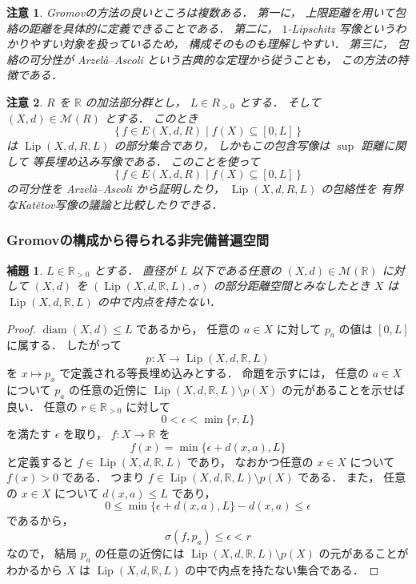\documentclass[leqno, 12pt]{jsarticle}
\newtheorem{lem}[thm]{補題}
\newtheorem*{rmk}{注意}
\newcommand{\rr}{\mathbb{R}}
\DeclareMathOperator{\di}{diam}
\DeclareMathOperator{\lip}{Lip}
\newcommand{\Met}[1]{\mathscr{M}(#1)}
\newcommand{\Espace}[3]{E(#1,#2,#3)}
\newcommand{\LipSpace}[4]{\lip(#1,#2,#3,#4)}
\newcommand{\LipDist}{\sigma}
\newcommand{\kura}[1]{p_{#1}}
\newcommand{\pospart}[1]{#1_{>0}}
\newcommand{\rrpos}{\pospart{\rr}}
\begin{document}
\begin{rmk}\label{rmk:gromov:advantages}
Gromovの方法の良いところは複数ある．
第一に，
上限距離を用いて包絡の距離を具体的に定義できることである．
第二に，
$1$-Lipschitz
写像というわかりやすい対象を扱っているため，
構成そのものも理解しやすい．
第三に，
包絡の可分性が
Arzel\`{a}--Ascoli
という古典的な定理から従うことも，
この方法の特徴である．
\end{rmk}

\begin{rmk}\label{rmk:diameter:bounded-injectivity}
$R$
を
$\rr$
の加法部分群とし，
$L\in\pospart{R}$
とする．
そして
$(X, d)\in \Met{R}$
とする．
このとき
\[
\{\,f\in\Espace{X}{d}{R}\mid f(X)\subseteq[0,L]\,\}
\]
は
$\LipSpace{X}{d}{R}{L}$
の部分集合であり，
しかもこの包含写像は
$\sup$
距離に関して
等長埋め込み写像である．
このことを使って
\[
\{\,f\in\Espace{X}{d}{R}\mid f(X)\subseteq[0,L]\,\}
\]
の可分性を
Arzel\`{a}--Ascoli
から証明したり，
$\LipSpace{X}{d}{R}{L}$
の包絡性を
有界なKat\v{e}tov写像の議論と比較したりできる．
\end{rmk}



\subsubsection{Gromovの構成から得られる非完備普遍空間}\label{subsubsec:function-envelope:gromov-noncomplete}


\begin{lem}\label{lem:func:naitenL}
$L\in \rrpos$
とする．
直径が
$L$
以下である任意の
$(X, d)\in \Met{\rr}$
に対して
$(X, d)$
を
$(\LipSpace{X}{d}{\rr}{L}, \LipDist)$
の部分距離空間とみなしたとき
$X$
は
$\LipSpace{X}{d}{\rr}{L}$
の中で内点を持たない．
\end{lem}
\begin{proof}
$\di(X,d)\le L$
であるから，
任意の
$a\in X$
に対して
$\kura{a}$
の値は
$[0,L]$
に属する．
したがって
\[
p\colon X\longrightarrow\LipSpace{X}{d}{\rr}{L}
\]
を
$x\mapsto \kura{x}$
で定義される等長埋め込みとする．
命題を示すには，
任意の
$a\in X$
について
$\kura{a}$
の任意の近傍に
$\LipSpace{X}{d}{\rr}{L}\setminus p(X)$
の元があることを示せば良い．
任意の
$r\in\rrpos$
に対して
\[
0<\epsilon<\min\{r,L\}
\]
を満たす
$\epsilon$
を取り，
$f\colon  X\to \rr$%
を
\[
f(x)=\min\{\epsilon +d(x, a), L\}
\]
と定義すると
$f\in \LipSpace{X}{d}{\rr}{L}$%
であり，
なおかつ任意の
$x\in X$%
について
$f(x)>0$%
である．
つまり
$f\in \LipSpace{X}{d}{\rr}{L}\setminus p(X)$
である．
また，
任意の
$x\in X$
について
$d(x,a)\le L$
であり，
\[
0
\le
\min\{\epsilon+d(x,a),L\}-d(x,a)
\le\epsilon
\]
であるから，
\[
\LipDist(f,\kura{a})\le\epsilon<r
\]
なので，
結局
$\kura{a}$
の任意の近傍には
$\LipSpace{X}{d}{\rr}{L}\setminus p(X)$
の元があることがわかるから
$X$
は
$\LipSpace{X}{d}{\rr}{L}$%
の中で内点を持たない集合である．
\end{proof}
\end{document}
